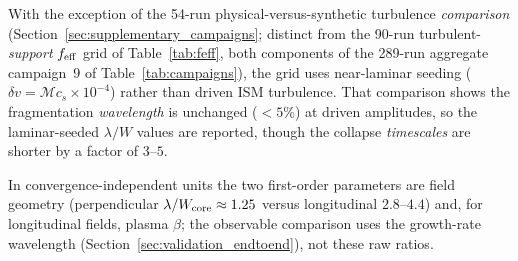\documentclass[usenatbib,twoside,twocolumn]{mnras}
\begin{document}
With the exception of the 54-run physical-versus-synthetic turbulence \emph{comparison} (Section~\ref{sec:supplementary_campaigns}; distinct from the 90-run turbulent-\emph{support} $f_{\rm eff}$ grid of Table~\ref{tab:feff}, both components of the 289-run aggregate campaign~9 of Table~\ref{tab:campaigns}), the grid uses near-laminar seeding ($\delta v=\mathcal{M}c_s\times10^{-4}$) rather than driven ISM turbulence. That comparison shows the fragmentation \textit{wavelength} is unchanged ($<5\%$) at driven amplitudes, so the laminar-seeded $\lambda/W$ values are reported, though the collapse \textit{timescales} are shorter by a factor of $3$--$5$.

In convergence-independent units the two first-order parameters are field geometry (perpendicular $\lambda/W_{\rm core}\approx1.25$ versus longitudinal $2.8$--$4.4$) and, for longitudinal fields, plasma $\beta$; the observable comparison uses the growth-rate wavelength (Section~\ref{sec:validation_endtoend}), not these raw ratios.


\end{document}
